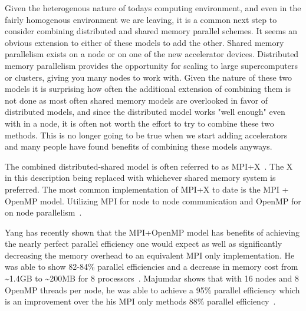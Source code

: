 %
Given the heterogenous nature of todays computing environment, and even in the fairly homogenous environment we are leaving, it is a common next step to consider combining distributed and shared memory parallel schemes.
%
It seems an obvious extension to either of these models to add the other.
%
Shared memory parallelism exists on a node or on one of the new accelerator devices.
%
Distributed memory parallelism provides the opportunity for scaling to large supercomputers or clusters, giving you many nodes to work with.
%
Given the nature of these two models it is surprising how often the additional extension of combining them is not done as most often shared memory models are overlooked in favor of distributed models, and since the distributed model works "well enough" even with in a node, it is often not worth the effort to try to combine these two methods.
%
This is no longer going to be true when we start adding accelerators and many people have found benefits of combining these models anyways.
%

%
The combined distributed-shared model is often referred to as MPI+X~\cite{michaelwolfe2014}.
%
The X in this description being replaced with whichever shared memory system is preferred.
%
The most common implementation of MPI+X to date is the MPI + OpenMP model.
%
Utilizing MPI for node to node communication and OpenMP for on node parallelism~\cite{michaelwolfe2014}.
%

%
Yang has recently shown that the MPI+OpenMP model has benefits of achieving the nearly perfect parallel efficiency one would expect as well as significantly decreasing the memory overhead to an equivalent MPI only implementation.
%
He was able to show 82-84\% parallel efficiencies and a decrease in memory cost from \textasciitilde1.4GB to \textasciitilde200MB for 8 processors~\cite{yanghybrid}.
%
Majumdar shows that with 16 nodes and 8 OpenMP threads per node, he was able to achieve a 95\% parallel efficiency which is an improvement over the his MPI only methods 88\% parallel efficiency~\cite{majumdar2000parallel}. 
%
